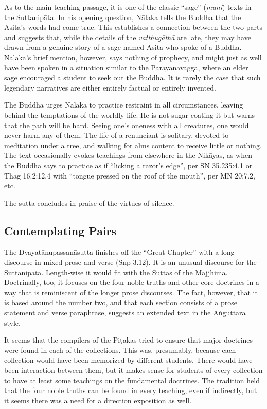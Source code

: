 \documentclass[12pt,openany]{book}%
\begin{document}
As to the main teaching passage, it is one of the classic “sage” (\textit{muni}) texts in the \textsanskrit{Suttanipāta}. In his opening question, \textsanskrit{Nālaka} tells the Buddha that the Asita’s words had come true. This establishes a connection between the two parts and suggests that, while the details of the \textit{\textsanskrit{vatthugāthā}} are late, they may have drawn from a genuine story of a sage named Asita who spoke of a Buddha. \textsanskrit{Nālaka}’s brief mention, however, says nothing of prophecy, and might just as well have been spoken in a situation similar to the \textsanskrit{Pārāyanavagga}, where an elder sage encouraged a student to seek out the Buddha. It is rarely the case that such legendary narratives are either entirely factual or entirely invented.

The Buddha urges \textsanskrit{Nālaka} to practice restraint in all circumstances, leaving behind the temptations of the worldly life. He is not sugar-coating it but warns that the path will be hard. Seeing one’s oneness with all creatures, one would never harm any of them. The life of a renunciant is solitary, devoted to meditation under a tree, and walking for alms content to receive little or nothing. The text occasionally evokes teachings from elsewhere in the \textsanskrit{Nikāyas}, as when the Buddha says to practice as if “licking a razor’s edge”, per SN 35.235:4.1 or Thag 16.2:12.4 with “tongue pressed on the roof of the mouth”, per MN 20:7.2, etc.

The sutta concludes in praise of the virtues of silence.

\subsection*{Contemplating Pairs}

The \textsanskrit{Dvayatānupassanāsutta} finishes off the “Great Chapter” with a long discourse in mixed prose and verse (Snp 3.12). It is an unusual discourse for the \textsanskrit{Suttanipāta}. Length-wise it would fit with the Suttas of the Majjhima. Doctrinally, too, it focuses on the four noble truths and other core doctrines in a way that is reminiscent of the longer prose discourses. The fact, however, that it is based around the number two, and that each section consists of a prose statement and verse paraphrase, suggests an extended text in the \textsanskrit{Aṅguttara} style.

It seems that the compilers of the \textsanskrit{Piṭakas} tried to ensure that major doctrines were found in each of the collections. This was, presumably, because each collection would have been memorized by different students. There would have been interaction between them, but it makes sense for students of every collection to have at least some teachings on the fundamental doctrines. The tradition held that the four noble truths can be found in every teaching, even if indirectly, but it seems there was a need for a direction exposition as well.
\end{document}
